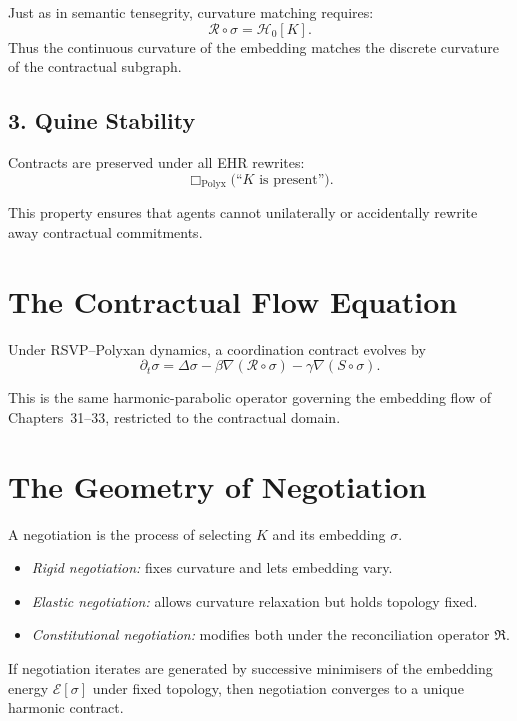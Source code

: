 Just as in semantic tensegrity,
curvature matching requires:
\[
\mathcal{R}\circ \sigma = \mathcal{H}_0[K].
\]
Thus the continuous curvature of the embedding matches
the discrete curvature of the contractual subgraph.


\subsection{3. Quine Stability}

Contracts are preserved under all EHR rewrites:
\[
\Box_{\mathrm{Polyx}}
\bigl( \text{``$K$ is present''} \bigr).
\]

This property ensures that agents cannot unilaterally
or accidentally rewrite away contractual commitments.


\section{The Contractual Flow Equation}

Under RSVP–Polyxan dynamics,
a coordination contract evolves by
\[
\partial_t \sigma
  = \Delta \sigma
  - \beta \nabla(\mathcal{R} \circ \sigma)
  - \gamma \nabla(S \circ \sigma).
\]

This is the same harmonic-parabolic operator
governing the embedding flow of Chapters~31–33,
restricted to the contractual domain.


\section{The Geometry of Negotiation}

A negotiation is the process of selecting $K$
and its embedding $\sigma$.

\begin{itemize}
    \item \emph{Rigid negotiation:}
    fixes curvature and lets embedding vary.
    \item \emph{Elastic negotiation:}
    allows curvature relaxation but holds topology fixed.
    \item \emph{Constitutional negotiation:}
    modifies both under the reconciliation operator $\mathfrak{R}$.
\end{itemize}

\begin{theorem}
If negotiation iterates are generated by successive minimisers of
the embedding energy $\mathcal{E}[\sigma]$ under fixed topology,
then negotiation converges to a unique harmonic contract.
\end{theorem}


